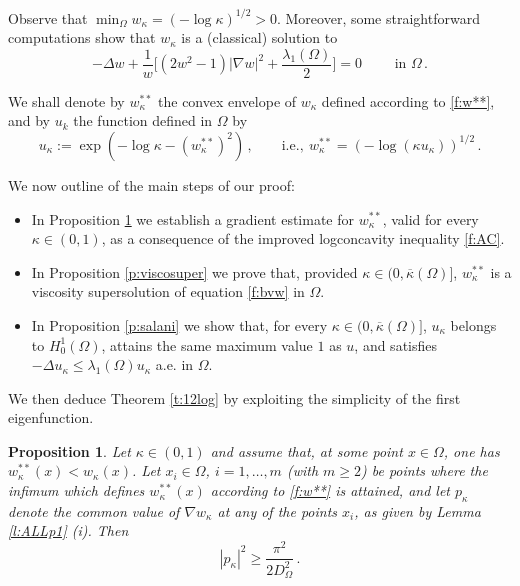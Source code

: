 \documentclass[11pt]{amsart}
\newtheorem{proposition}[theorem]{Proposition}
\theoremstyle{definition}
\theoremstyle{remark}
\def\Om{\Omega}
\def\k{\kappa}
\begin{document}
Observe that $\min_\Omega w_\k = (- \log \k ) ^ { 1/2} > 0$. 
Moreover, some straightforward  computations show that $w _\k $ is a (classical) solution to 
\begin{equation}\label{f:bvw}
 - \Delta w + \frac{1}{w} \big [ ( 2 w ^ 2 -1 ) |\nabla w| ^ 2 +\frac{\lambda _ 1 (\Om) }{2} \big ] = 0 \qquad \text{ in } \Om\,. 
 \end{equation} 

 

We shall denote by $w _\k ^ { **}$ the convex envelope of $w _\k$ defined according to \eqref{f:w**}, 
and by $u _k$ the function defined in $\Om$ by 
\begin{equation}\label{f:normu} 
u_\k := \exp (  - \log \k -  ( w _\k ^ {**} ) ^ 2  ) 
\,, \qquad \text{i.e.},\  w_\k ^ {**} = (- \log (\k u_\k) ) ^ { 1/2}\, .
\end{equation}   
 

We now outline of the main steps of our proof: 
\smallskip

\begin{itemize} 
\item[--]  In Proposition \ref{p:key} we establish a gradient estimate for $w _\k ^ { **}$, valid for every $\k \in (0, 1)$,  as a consequence of the improved logconcavity inequality \eqref{f:AC}.
\smallskip

\item[--] In Proposition  \ref{p:viscosuper}    we prove that, provided  $\k \in (0, \overline \k (\Om)]$, $w _\k ^ { **}$ is a viscosity supersolution of equation \eqref{f:bvw} in $\Om$. 
\smallskip

\item[--]  In Proposition \ref{p:salani} we show that, for every $\k \in (0, \overline \k (\Om)]$, $u _\k$   belongs to $H ^ 1 _0 (\Om)$,
attains the same maximum value $1$ as $u$, and satisfies $-\Delta  u _\k   \leq  \lambda _ 1 (\Om )   u  _\k  $ a.e. in  $ \Om$.
 \end{itemize} 

\smallskip 

We then deduce Theorem  \ref{t:12log} by exploiting the simplicity of the first eigenfunction. 
\medskip 

\begin{proposition}\label{p:key}  Let $\k \in (0, 1)$ and assume that, at some point $x \in \Om$, one has $w _\k   ^ { **}  (x) < w _\k  (x) $. 
Let $x _i \in \Om$, $i = 1, \dots, m$  (with $m \geq 2$) be points where the infimum which defines   $w _\k   ^ { **}  (x)$ according to
\eqref{f:w**} is attained, and let $p_\k$ 
denote  the common value of  $\nabla w _\k$ at any of the points   $x_i$, as given by Lemma  \ref{l:ALLp1}  (i). 
Then 
 $$|p_\k | ^ 2 \geq  \frac{\pi ^ 2}{2 D _\Om ^ 2} \,.$$   
\end{proposition} 
\end{document}
